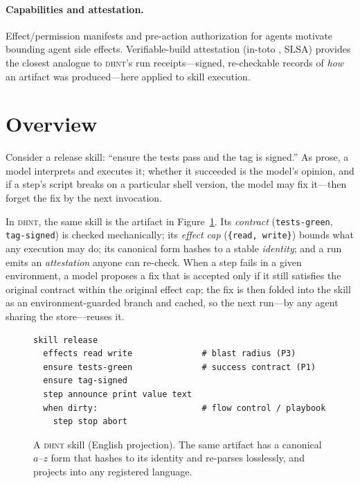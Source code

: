 \documentclass[11pt]{article}
\newcommand{\dhnt}{\textsc{dhnt}}
\begin{document}
\paragraph{Capabilities and attestation.} Effect/permission manifests and
pre-action authorization for agents \cite{permmanifest} motivate bounding agent
side effects. Verifiable-build attestation (in-toto \cite{intoto}, SLSA) provides
the closest analogue to \dhnt{}'s run receipts---signed, re-checkable records of
\emph{how} an artifact was produced---here applied to skill execution.

\section{Overview}\label{sec:overview}

Consider a release skill: ``ensure the tests pass and the tag is signed.'' As
prose, a model interprets and executes it; whether it succeeded is the model's
opinion, and if a step's script breaks on a particular shell version, the model
may fix it---then forget the fix by the next invocation.

In \dhnt{}, the same skill is the artifact in Figure~\ref{fig:skill}. Its
\emph{contract} (\texttt{tests-green}, \texttt{tag-signed}) is checked
mechanically; its \emph{effect cap} (\texttt{\{read, write\}}) bounds what any
execution may do; its canonical form hashes to a stable \emph{identity}; and a
run emits an \emph{attestation} anyone can re-check. When a step fails in a given
environment, a model proposes a fix that is accepted only if it still satisfies
the original contract within the original effect cap; the fix is then folded into
the skill as an environment-guarded branch and cached, so the next run---by any
agent sharing the store---reuses it.

\begin{figure}[t]
\begin{lstlisting}
skill release
  effects read write              # blast radius (P3)
  ensure tests-green              # success contract (P1)
  ensure tag-signed
  step announce print value text
  when dirty:                     # flow control / playbook
    step stop abort
\end{lstlisting}
\caption{A \dhnt{} skill (English projection). The same artifact has a canonical
$a$--$z$ form that hashes to its identity and re-parses losslessly, and projects
into any registered language.}
\label{fig:skill}
\end{figure}
\end{document}
